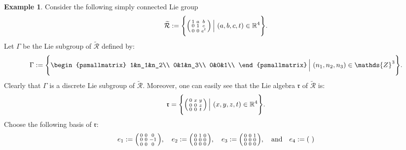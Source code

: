 \documentclass[preprint,12pt,1p]{elsarticle}
\theoremstyle{plain}
\theoremstyle{definition}
\newtheorem{example}[theorem]{Example}
\newcommand{\rel}{\mathbb{R}}
\newcommand{\intg}{\mathds{Z}}
\newcommand{\et}{\quad \textnormal{and}\quad}
\numberwithin{equation}{section}
\begin{document}
\begin{example}
Consider the following simply connected Lie group
\begin{equation*}
\widetilde{\mathcal{R}}:=\Bigg\{\begin{psmallmatrix}
1&a&b\\0&1&c\\0&0&e^t\\
\end{psmallmatrix}\,\Big|\,\,(a,b,c,t)\in\rel^4\Bigg\}.
\end{equation*}
Let $\Gamma$ be the Lie subgroup of $\widetilde{\mathcal{R}}$ defined by:
\begin{equation*}
\Gamma:=\Bigg\{\begin{psmallmatrix}
1&n_1&n_2\\
0&1&n_3\\
0&0&1\\
\end{psmallmatrix}\,\Big|\,\,(n_1,n_2,n_3)\in\intg^3\Bigg\}.
\end{equation*}
Clearly that $\Gamma$ is a discrete Lie subgroup of $\widetilde{\mathcal{R}}$. Moreover, one can easily see that the Lie algebra $\mathfrak{r}$ of $\widetilde{\mathcal{R}}$ is:
\begin{equation*}
\mathfrak{r}=\Bigg\{\begin{psmallmatrix}
0&x&y\\0&0&z\\0&0&t\\
\end{psmallmatrix}\,\Big|\,\,(x,y,z,t)\in\rel^4\Bigg\}.
\end{equation*}
Choose the following basis of $\mathfrak{r}$:
\begin{equation*}
e_1:=\begin{psmallmatrix}
0&0&0\\0&0&-1\\0&0&0\\
\end{psmallmatrix},\quad e_2:=\begin{psmallmatrix}
0&1&0\\0&0&0\\0&0&0\\
\end{psmallmatrix},\quad e_3:=\begin{psmallmatrix}
0&0&1\\0&0&0\\0&0&0\\
\end{psmallmatrix},\et e_4:=\begin{psmallmatrix}

\end{psmallmatrix}
\end{equation*}
\end{example}
\end{document}
